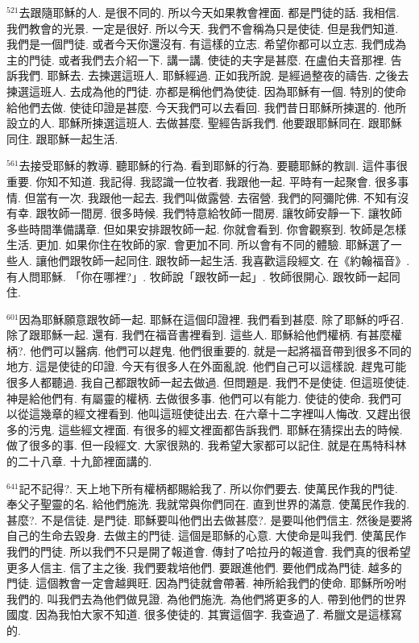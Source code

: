 \documentclass{book}
\begin{document}
$^{521}$去跟隨耶穌的人.
是很不同的.
所以今天如果教會裡面.
都是門徒的話.
我相信.
我們教會的光景.
一定是很好.
所以今天.
我們不會稱為只是使徒.
但是我們知道.
我們是一個門徒.
或者今天你還沒有.
有這樣的立志.
希望你都可以立志.
我們成為主的門徒.
或者我們去介紹一下.
講一講.
使徒的夫字是甚麼.
在盧伯夫音那裡.
告訴我們.
耶穌去.
去揀選這班人.
耶穌經過.
正如我所說.
是經過整夜的禱告.
之後去揀選這班人.
去成為他的門徒.
亦都是稱他們為使徒.
因為耶穌有一個.
特別的使命給他們去做.
使徒印證是甚麼.
今天我們可以去看回.
我們昔日耶穌所揀選的.
他所設立的人.
耶穌所揀選這班人.
去做甚麼.
聖經告訴我們.
他要跟耶穌同在.
跟耶穌同住.
跟耶穌一起生活.

$^{561}$去接受耶穌的教導.
聽耶穌的行為.
看到耶穌的行為.
要聽耶穌的教訓.
這件事很重要.
你知不知道.
我記得.
我認識一位牧者.
我跟他一起.
平時有一起聚會.
很多事情.
但當有一次.
我跟他一起去.
我們叫做露營.
去宿營.
我們的阿彌陀佛.
不知有沒有幸.
跟牧師一間房.
很多時候.
我們特意給牧師一間房.
讓牧師安靜一下.
讓牧師多些時間準備講章.
但如果安排跟牧師一起.
你就會看到.
你會觀察到.
牧師是怎樣生活.
更加.
如果你住在牧師的家.
會更加不同.
所以會有不同的體驗.
耶穌選了一些人.
讓他們跟牧師一起同住.
跟牧師一起生活.
我喜歡這段經文.
在《約翰福音》.
有人問耶穌.
「你在哪裡?」.
牧師說「跟牧師一起」.
牧師很開心.
跟牧師一起同住.

$^{601}$因為耶穌願意跟牧師一起.
耶穌在這個印證裡.
我們看到甚麼.
除了耶穌的呼召.
除了跟耶穌一起.
還有.
我們在福音書裡看到.
這些人.
耶穌給他們權柄.
有甚麼權柄?.
他們可以醫病.
他們可以趕鬼.
他們很重要的.
就是一起將福音帶到很多不同的地方.
這是使徒的印證.
今天有很多人在外面亂說.
他們自己可以這樣說.
趕鬼可能很多人都聽過.
我自己都跟牧師一起去做過.
但問題是.
我們不是使徒.
但這班使徒.
神是給他們有.
有屬靈的權柄.
去做很多事.
他們可以有能力.
使徒的使命.
我們可以從這幾章的經文裡看到.
他叫這班使徒出去.
在六章十二字裡叫人悔改.
又趕出很多的污鬼.
這些經文裡面.
有很多的經文裡面都告訴我們.
耶穌在猜探出去的時候.
做了很多的事.
但一段經文.
大家很熟的.
我希望大家都可以記住.
就是在馬特科林的二十八章.
十九節裡面講的.

$^{641}$記不記得?.
天上地下所有權柄都賜給我了.
所以你們要去.
使萬民作我的門徒.
奉父子聖靈的名.
給他們施洗.
我就常與你們同在.
直到世界的滿意.
使萬民作我的.
甚麼?.
不是信徒.
是門徒.
耶穌要叫他們出去做甚麼?.
是要叫他們信主.
然後是要將自己的生命去毀身.
去做主的門徒.
這個是耶穌的心意.
大使命是叫我們.
使萬民作我們的門徒.
所以我們不只是開了報道會.
傳封了哈拉丹的報道會.
我們真的很希望更多人信主.
信了主之後.
我們要栽培他們.
要跟進他們.
要他們成為門徒.
越多的門徒.
這個教會一定會越興旺.
因為門徒就會帶著.
神所給我們的使命.
耶穌所吩咐我們的.
叫我們去為他們做見證.
為他們施洗.
為他們將更多的人.
帶到他們的世界國度.
因為我怕大家不知道.
很多使徒的.
其實這個字.
我查過了.
希臘文是這樣寫的.
\end{document}
